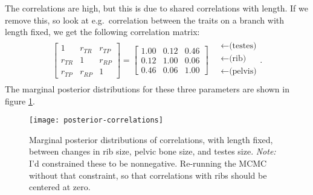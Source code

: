 \documentclass{article}
\begin{document}
The correlations are high, but this is due to shared correlations with length.
If we remove this, so look at e.g.\ correlation between the traits on a branch with length fixed,
we get the following correlation matrix:
\begin{align}
\begin{bmatrix}
  1 & r_{TR} & r_{TP} \\ 
  r_{TR} & 1 & r_{RP} \\ 
  r_{TP} & r_{RP} & 1 
 \end{bmatrix}
 =
\begin{bmatrix}
   1.00 & 0.12 & 0.46 \\ 
   0.12 & 1.00 & 0.06 \\ 
   0.46 & 0.06 & 1.00 
 \end{bmatrix}
\quad \begin{matrix}
  \leftarrow \text{(testes)} \\
  \leftarrow \text{(rib)} \\
  \leftarrow \text{(pelvis)} \\
\end{matrix}  .
\end{align}
The marginal posterior distributions for these three parameters
are shown in figure \ref{fig:posterior_cors}.

\begin{figure}[ht]
  \begin{center}
    \texttt{[image: posterior-correlations]}
  \end{center}
  \caption{Marginal posterior distributions of correlations, with length fixed,
  between changes in rib size, pelvic bone size, and testes size.
  \emph{Note:} I'd constrained these to be nonnegative.  
  Re-running the MCMC without that constraint, so that correlations with ribs should be centered at zero.
  \label{fig:posterior_cors}
  }
\end{figure}
\end{document}
